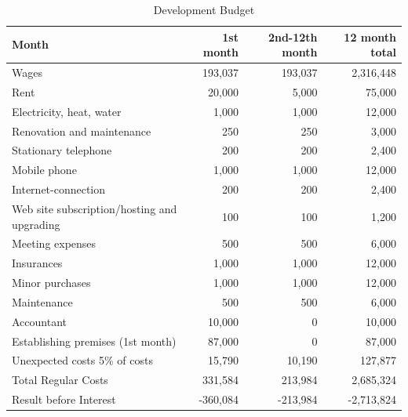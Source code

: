 \begin{table}[h!]
\begin{tabular}{l *{3}{r}}
Month                                               &  1st month& 2nd-12th month& 12 month total\\ \hline
Wages                                               &  193,037	& 193,037       & 2,316,448    \\
Rent                                                &  20,000	& 5,000	        & 75,000       \\
Electricity, heat, water                            &  1,000	& 1,000	        & 12,000       \\
Renovation and maintenance                          &  250	& 250	        & 3,000        \\
Stationary telephone                                &  200	& 200	        & 2,400        \\
Mobile phone                                        &  1,000	& 1,000	        & 12,000       \\
Internet-connection                                 &  200	& 200	        & 2,400        \\
Web site subscription/hosting and upgrading         &  100	& 100	        & 1,200        \\
Meeting expenses                                    &  500	& 500	        & 6,000        \\
Insurances                                          &  1,000	& 1,000	        & 12,000       \\
Minor purchases                                     &  1,000	& 1,000	        & 12,000       \\
Maintenance                                         &  500	& 500	        & 6,000        \\
Accountant                                          &  10,000	& 0	        & 10,000       \\
Establishing premises (1st month)                   &  87,000	& 0	        & 87,000       \\
Unexpected costs 5\% of costs                       &  15,790	& 10,190	& 127,877      \\
Total Regular Costs                                 &  331,584	& 213,984	& 2,685,324    \\
Result before Interest                              &  -360,084	& -213,984	& -2,713,824   \\
\end{tabular}
\caption{Development Budget}
\end{table}


